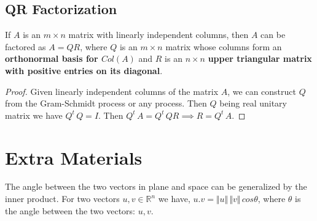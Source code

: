 \documentclass[aima104_lecturenotes_ku.tex]{subfiles}
\begin{document}
\subsection{QR Factorization}
\begin{theorem}
  If $A$ is an $m \times n$ matrix with linearly independent columns, then $A$ can be factored as $A=QR$, where $Q$ is an $m \times n$ matrix whose columns form an \textbf{orthonormal basis for $Col(A)$} and $R$ is an $n \times n$ \textbf{upper triangular matrix with positive entries on its diagonal}.
\end{theorem}

\begin{proof}
  Given linearly independent columns of the matrix $A$, we can construct $Q$ from the Gram-Schmidt process or any process. Then $Q$ being real unitary matrix we have $Q^t\, Q = I$. Then $Q^t\, A = Q^t\,Q R \implies R = Q^t\, A$.
\end{proof}
\section{Extra Materials}
The angle between the two vectors in plane and space can be generalized by the inner product. For two vectors $u,v \in \mathbb{R}^n$ we have, $u.v = \Vert u \Vert\, \Vert v \Vert \, cos\theta$, where $\theta$ is the angle between the two vectors: $u,v$.
\end{document}
